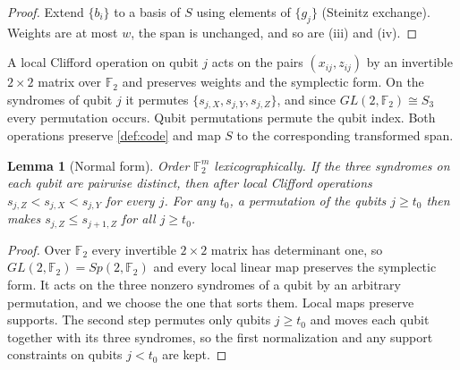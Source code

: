 \documentclass[a4paper,onecolumn,unpublished]{quantumarticle}
\newtheorem{lemma}[theorem]{Lemma}
\theoremstyle{definition}
\theoremstyle{remark}
\newcommand{\F}{\mathbb{F}_2}
\begin{document}
\begin{proof}
Extend $\{b_i\}$ to a basis of $S$ using elements of $\{g_j\}$ (Steinitz exchange). Weights are at
most $w$, the span is unchanged, and so are (iii) and (iv).
\end{proof}

A local Clifford operation on qubit $j$ acts on the pairs $(x_{ij},z_{ij})$ by an invertible
$2\times2$ matrix over $\F$ and preserves weights and the symplectic form. On the syndromes of
qubit $j$ it permutes $\{s_{j,X},s_{j,Y},s_{j,Z}\}$, and since $GL(2,\F)\cong S_3$ every permutation
occurs. Qubit permutations permute the qubit index. Both operations preserve \cref{def:code} and
map $S$ to the corresponding transformed span.

\begin{lemma}[Normal form]
\label{lem:normal}
Order $\F^m$ lexicographically. If the three syndromes on each qubit are pairwise distinct, then
after local Clifford operations $s_{j,Z}<s_{j,X}<s_{j,Y}$ for every $j$. For any $t_0$, a
permutation of the qubits $j\ge t_0$ then makes $s_{j,Z}\le s_{j+1,Z}$ for all $j\ge t_0$.
\end{lemma}

\begin{proof}
Over $\F$ every invertible $2\times2$ matrix has determinant one, so $GL(2,\F)=Sp(2,\F)$ and every
local linear map preserves the symplectic form. It acts on the three nonzero syndromes of a qubit
by an arbitrary permutation, and we choose the one that sorts them. Local maps preserve supports.
The second step permutes only qubits $j\ge t_0$ and moves each qubit together with its three
syndromes, so the first normalization and any support constraints on qubits $j<t_0$ are kept.
\end{proof}
\end{document}

